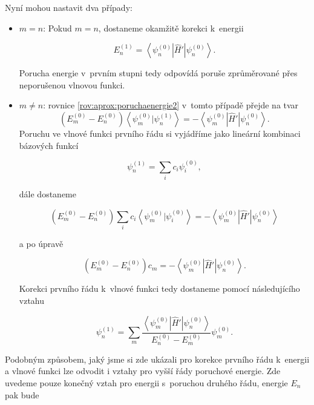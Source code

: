 \noindent Nyní mohou nastavit dva případy:
\begin{itemize}
\item $m=n$:
Pokud $m=n$, dostaneme okamžitě korekci k~energii


\begin{equation}
\boxed{E_n^{(1)}=\left < \psi_n^{(0)}|\hat{H}'|\psi_n^{(0)} \right >.}
\label{rov:PorusenaEnergie}
\end{equation} 

Porucha energie v~prvním stupni tedy odpovídá poruše zprůměrované přes neporušenou vlnovou funkci.

\item $m \neq n$:
rovnice \ref{rov:aprox:poruchaenergie2} v~tomto případě přejde na tvar
\begin{equation}
\left(E_m^{(0)}-E_n^{(0)}\right)\left < \psi_m^{(0)}|\psi_n^{(1)} \right >=
-\left < \psi_m^{(0)}|\hat{H}'|\psi_n^{(0)} \right >.
\end{equation}
 Poruchu ve vlnové funkci prvního řádu si vyjádříme jako lineární kombinaci bázových funkcí

\begin{equation}
\psi_n^{(1)}=\sum_i c_i \psi^{(0)}_i, 
\end{equation}

dále dostaneme

\begin{equation}
\left(E_m^{(0)}-E_n^{(0)}\right)\sum_i c_i\left < \psi_m^{(0)}| \psi^{(0)}_i \right >=
-\left < \psi_m^{(0)}|\hat{H}'|\psi_n^{(0)} \right >
\end{equation}

a po úpravě 

\begin{equation}
\left(E_m^{(0)}-E_n^{(0)}\right) c_m=
-\left < \psi_m^{(0)}|\hat{H}'|\psi_n^{(0)} \right >.
\end{equation}

Korekci prvního řádu k~vlnové funkci tedy dostaneme pomocí následujícího vztahu 

\begin{equation}
\boxed{\psi_n^{(1)}=\sum_m \frac{\left < \psi_m^{(0)}|\hat{H}'|\psi_n^{(0)} \right >}{E_n^{(0)}-E_m^{(0)}}\psi_m^{(0)}.}
\end{equation} 

\end{itemize}

Podobným způsobem, jaký jsme si zde ukázali pro korekce prvního řádu k~energii a vlnové funkci lze odvodit i vztahy pro vyšší řády poruchové energie. Zde uvedeme pouze konečný vztah pro energii s~poruchou druhého řádu, energie $E_n$ pak bude

